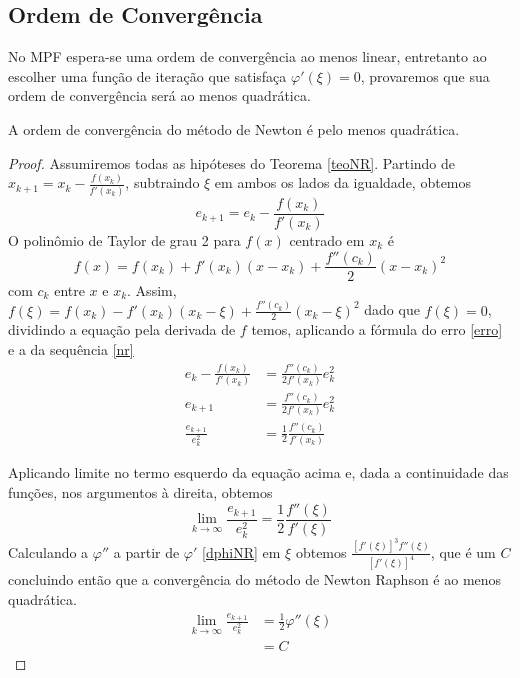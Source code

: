 \subsection{Ordem de Convergência}
No MPF espera-se uma ordem de convergência ao menos linear, entretanto ao
escolher uma função de iteração que satisfaça $\varphi'(\xi) = 0$, provaremos
que sua ordem de convergência será ao menos quadrática.
\begin{prop}
    A ordem de convergência do método de Newton é pelo menos quadrática.
\end{prop}
\begin{proof}
    Assumiremos todas as hipóteses do Teorema \ref{teoNR}. %
    Partindo de $x_{k+1} = x_k - \frac{f(x_k)}{f'(x_k)}$, subtraindo $\xi$ em ambos os lados da igualdade, obtemos
    \begin{equation} \label{eMNR}
        e_{k+1} = e_k - \frac{f(x_k)}{f'(x_k)}
    \end{equation}
    O polinômio de Taylor de grau 2 para $f(x)$ centrado em $x_k$ é
    \begin{equation*}
        f(x) = f(x_k) + f'(x_k)(x - x_k) + \frac{f''(c_k)}{2}(x-x_k)^2
    \end{equation*}
    com $c_k$ entre $x$ e $x_k$.
    Assim, $f(\xi) = f(x_k) - f'(x_k)(x_k - \xi) + \frac{f''(c_k)}{2}(x_k-\xi)^2$
    dado que $f(\xi) = 0$, dividindo a equação pela derivada de $f$ temos,
    aplicando a fórmula do erro \ref{erro} e a da sequência \ref{nr}
    \begin{align*}
        e_k - \frac{f(x_k)}{f'(x_k)} & = \frac{f''(c_k)}{2f'(x_k)}e_k^2       \\
        e_{k+1}                      & = \frac{f''(c_k)}{2f'(x_k)}e_k^2       \\
        \frac{e_{k+1}}{e_k^2}        & = \frac{1}{2} \frac{f''(c_k)}{f'(x_k)}
    \end{align*}

    Aplicando limite no termo esquerdo da equação acima e, dada a continuidade das
    funções, nos argumentos à direita, obtemos
    \begin{equation*}
        \lim_{k \to \infty} \frac{e_{k+1}}{e_k^2} = \frac{1}{2} \frac{f''(\xi)}{f'(\xi)}
    \end{equation*}
    Calculando a $\varphi''$ a partir de $\varphi'$ \ref{dphiNR} %
    em $\xi$ obtemos $\frac{[f'(\xi)]^3f''(\xi)}{[f'(\xi)]^4}$, que é um $C$ concluindo então que a convergência do método de Newton Raphson é ao menos quadrática.
    \begin{align*}
        \lim_{k \to \infty} \frac{e_{k+1}}{e_k^2} & = \frac{1}{2} \varphi''(\xi) \\
                                                  & = C
    \end{align*}
\end{proof}


